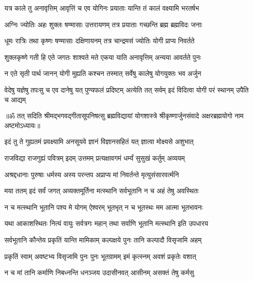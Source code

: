 \twolineshloka
{यत्र काले तु अनावृत्तिम् आवृत्तिं च एव योगिनः}
{प्रयाताः यान्ति तं कालं वक्ष्यामि भरतर्षभ}%

\twolineshloka
{अग्निः ज्योतिः अहः शुक्लः षण्मासाः उत्तरायणम्}
{तत्र प्रयाताः गच्छन्ति ब्रह्म ब्रह्मविदः जनाः}%

\twolineshloka
{धूमः रात्रिः तथा कृष्णः षण्मासाः दक्षिणायनम्}
{तत्र चान्द्रमसं ज्योतिः योगी प्राप्य निवर्तते}%

\twolineshloka
{शुक्लकृष्णे गती हि एते जगतः शाश्वते मते}
{एकया याति अनावृत्तिम् अन्यया आवर्तते पुनः}%

\twolineshloka
{न एते सृती पार्थ जानन् योगी मुह्यति कश्चन}
{तस्मात् सर्वेषु कालेषु योगयुक्तः भव अर्जुन}%

\fourlineindentedshloka
{वेदेषु यज्ञेषु तपःसु च एव}
{दानेषु यत् पुण्यफलं प्रदिष्टम्}
{अत्येति तत् सर्वम् इदं विदित्वा}
{योगी परं स्थानम् उपैति च आद्यम्}%

{॥ॐ तत् सदिति श्रीमद्भगवद्गीतासूपनिषत्सु ब्रह्मविद्यायां योगशास्त्रे श्रीकृष्णार्जुनसंवादे अक्षरब्रह्मयोगो नाम अष्टमोऽध्यायः॥}



\twolineshloka
{इदं तु ते गुह्यतमं प्रवक्ष्यामि अनसूयवे}
{ज्ञानं विज्ञानसहितं यत् ज्ञात्वा मोक्ष्यसे अशुभात्}%

\twolineshloka
{राजविद्या राजगुह्यं पवित्रम् इदम् उत्तमम्}
{प्रत्यक्षावगमं धर्म्यं सुसुखं कर्तुम् अव्ययम्}%

\twolineshloka
{अश्रद्दधानाः पुरुषाः धर्मस्य अस्य परन्तप}
{अप्राप्य मां निवर्तन्ते मृत्युसंसारवर्त्मनि}%

\twolineshloka
{मया ततम् इदं सर्वं जगत् अव्यक्तमूर्तिना}
{मत्स्थानि सर्वभूतानि न च अहं तेषु अवस्थितः}%

\twolineshloka
{न च मत्स्थानि भूतानि पश्य मे योगम् ऐश्वरम्}
{भूतभृत् न च भूतस्थः मम आत्मा भूतभावनः}%

\twolineshloka
{यथा आकाशस्थितः नित्यं वायुः सर्वत्रगः महान्}
{तथा सर्वाणि भूतानि मत्स्थानि इति उपधारय}%

\twolineshloka
{सर्वभूतानि कौन्तेय प्रकृतिं यान्ति मामिकाम्}
{कल्पक्षये पुनः तानि कल्पादौ विसृजामि अहम्}%

\twolineshloka
{प्रकृतिं स्वाम् अवष्टभ्य विसृजामि पुनः पुनः}
{भूतग्रामम् इमं कृत्स्नम् अवशं प्रकृतेः वशात्}%

\twolineshloka
{न च मां तानि कर्माणि निबध्नन्ति धनञ्जय}
{उदासीनवत् आसीनम् असक्तं तेषु कर्मसु}%

